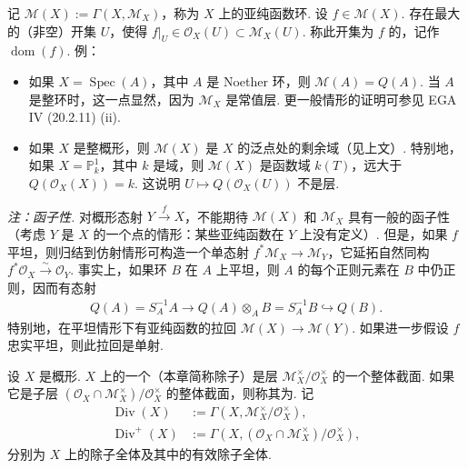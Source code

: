 \begin{numpara}[亚纯函数及其定义域]\label{item:ag-1-1-3}
记 $\mathcal M(X):=\Gamma(X,\mathcal M_X)$，称为 $X$ 上的亚纯函数环. 设 $f\in\mathcal M(X)$. 存在最大的（非空）开集 $U$，使得 $f|_U\in\mathcal O_X(U)\subset\mathcal M_X(U)$. 称此开集为 $f$ 的，记作 $\operatorname{dom}(f)$.
例：
\begin{itemize}
\item 如果 $X=\operatorname{Spec}(A)$，其中 $A$ 是 Noether 环，则 $\mathcal M(A)=Q(A)$. 当 $A$ 是整环时，这一点显然，因为 $\mathcal M_X$ 是常值层. 更一般情形的证明可参见 EGA IV (20.2.11) (ii).
\item 如果 $X$ 是整概形，则 $\mathcal M(X)$ 是 $X$ 的泛点处的剩余域（见上文）. 特别地，如果 $X=\mathbb P_k^1$，其中 $k$ 是域，则 $\mathcal M(X)$ 是函数域 $k(T)$，远大于 $Q(\mathcal O_X(X))=k$. 这说明 $U\mapsto Q(\mathcal O_X(U))$ 不是层.
\end{itemize}
\emph{注：函子性.} 对概形态射 $Y\xrightarrow f X$，不能期待 $\mathcal M(X)$ 和 $\mathcal M_X$ 具有一般的函子性（考虑 $Y$ 是 $X$ 的一个点的情形：某些亚纯函数在 $Y$ 上没有定义）. 但是，如果 $f$ 平坦，则归结到仿射情形可构造一个单态射 $f^*\mathcal M_X\longrightarrow\mathcal M_Y$，它延拓自然同构 $f^*\mathcal O_X\xrightarrow\sim\mathcal O_Y$. 事实上，如果环 $B$ 在 $A$ 上平坦，则 $A$ 的每个正则元素在 $B$ 中仍正则，因而有态射
\begin{align*}
Q(A)=S_A^{-1}A\longrightarrow Q(A)\otimes_A B=S_A^{-1}B\hookrightarrow Q(B).
\end{align*}
特别地，在平坦情形下有亚纯函数的拉回 $\mathcal M(X)\longrightarrow\mathcal M(Y)$. 如果进一步假设 $f$ 忠实平坦，则此拉回是单射.
\end{numpara}
\begin{definition}\label{item:ag-1-1-4}
设 $X$ 是概形. $X$ 上的一个（本章简称除子）是层 $\mathcal M_X^\times/\mathcal O_X^\times$ 的一个整体截面. 如果它是子层 $(\mathcal O_X\cap\mathcal M_X^\times)/\mathcal O_X^\times$ 的整体截面，则称其为. 记
\begin{align*}
\operatorname{Div}(X)&:=\Gamma(X,\mathcal M_X^\times/\mathcal O_X^\times),\\
\operatorname{Div}^+(X)&:=\Gamma(X,(\mathcal O_X\cap\mathcal M_X^\times)/\mathcal O_X^\times),
\end{align*}
分别为 $X$ 上的除子全体及其中的有效除子全体.
\end{definition}

